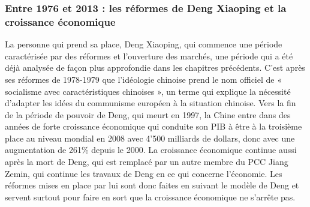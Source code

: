 \subsubsection{Entre 1976 et 2013 : les réformes de Deng Xiaoping et la croissance économique}
La personne qui prend sa place, Deng Xiaoping, qui commence une période caractérisée par des réformes et l’ouverture des marchés, une période qui a été déjà analysée de façon plus approfondie dans les chapitres précédents. C’est après ses réformes de 1978-1979 que l’idéologie chinoise prend le nom officiel de « socialisme avec caractéristiques chinoises », un terme qui explique la nécessité d’adapter les idées du communisme européen à la situation chinoise.  Vers la fin de la période de pouvoir de Deng, qui meurt en 1997,  la Chine entre dans des années de forte croissance économique qui conduite son PIB à être à la troisième place au niveau mondial en 2008 avec 4'500 milliards de dollars, donc avec une augmentation de 261\% depuis le 2000.  La croissance économique continue aussi après la mort de Deng, qui est remplacé par un autre membre du PCC Jiang Zemin, qui continue les travaux de Deng en ce qui concerne l’économie. Les réformes mises en place par lui sont donc faites en suivant le modèle de Deng et servent surtout pour faire en sort que la croissance économique ne s’arrête pas. 
